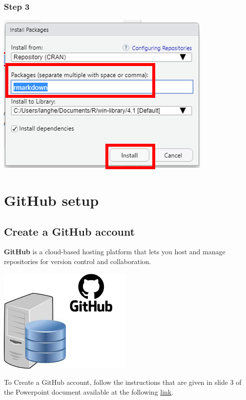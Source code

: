 \documentclass[
  letterpaper,
  DIV=11,
  numbers=noendperiod,
  oneside]{scrreprt}
\begin{document}
\subsection{Step 3}

\includegraphics{images/paste-BE660336.png}

\hypertarget{github-setup}{%
\chapter{GitHub setup}\label{github-setup}}

\hypertarget{sec-GitHub-account-creation}{%
\section{Create a GitHub account}\label{sec-GitHub-account-creation}}

\textbf{GitHub} is a cloud-based hosting platform that lets you host and
manage repositories for version control and collaboration.

\includegraphics[width=2.60417in,height=\textheight]{images/paste-15A58C67.png}

To Create a GitHub account, follow the instructions that are given in
slide 3 of the Powerpoint document available at the following
\href{https://drive.switch.ch/index.php/s/1eFnksrX0UtjfZV}{link}.
\end{document}
